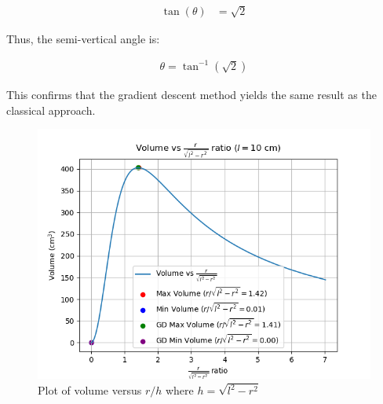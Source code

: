 \documentclass[journal]{IEEEtran}
\begin{document}
\begin{align}
\tan(\theta) &= \sqrt{2}
\end{align}

Thus, the semi-vertical angle is:

\begin{align}
\boxed{\theta = \tan^{-1}(\sqrt{2})}
\end{align}

This confirms that the gradient descent method yields the same result as the classical approach.


		\begin{figure}[h!]
		\centering
		\includegraphics[width=\columnwidth]{figs/fig1.png}
			\caption{Plot of volume versus $r/h$ where $h=\sqrt{l^2-r^2}$}
		\label{stemplot}
	\end{figure}
	
\end{document}
